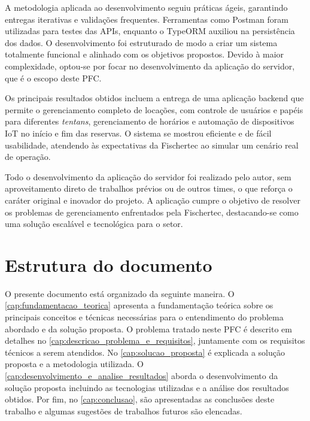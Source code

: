 A metodologia aplicada ao desenvolvimento seguiu práticas ágeis, garantindo entregas iterativas e validações frequentes. Ferramentas como Postman foram utilizadas para testes das APIs, enquanto o TypeORM auxiliou na persistência dos dados. O desenvolvimento foi estruturado de modo a criar um sistema totalmente funcional e alinhado com os objetivos propostos. Devido à maior complexidade, optou-se por focar no desenvolvimento da aplicação do servidor, que é o escopo deste PFC.

Os principais resultados obtidos incluem a entrega de uma aplicação backend que permite o gerenciamento completo de locações, com controle de usuários e papéis para diferentes \textit{tentans}, gerenciamento de horários e automação de dispositivos IoT no início e fim das reservas. O sistema se mostrou eficiente e de fácil usabilidade, atendendo às expectativas da Fischertec ao simular um cenário real de operação. 

Todo o desenvolvimento da aplicação do servidor foi realizado pelo autor, sem aproveitamento direto de trabalhos prévios ou de outros times, o que reforça o caráter original e inovador do projeto. A aplicação cumpre o objetivo de resolver os problemas de gerenciamento enfrentados pela Fischertec, destacando-se como uma solução escalável e tecnológica para o setor.

\section{Estrutura do documento}

O presente documento está organizado da seguinte maneira. O \autoref{cap:fundamentacao_teorica} apresenta a fundamentação teórica sobre os principais conceitos e técnicas necessárias para o entendimento do problema abordado e da solução proposta. O problema tratado neste PFC é descrito em detalhes no \autoref{cap:descricao_problema_e_requisitos}, juntamente com os requisitos técnicos a serem atendidos. No \autoref{cap:solucao_proposta} é explicada a solução proposta e a metodologia utilizada. O \autoref{cap:desenvolvimento_e_analise_resultados} aborda o desenvolvimento da solução proposta incluindo as tecnologias utilizadas e a análise dos resultados obtidos. Por fim, no \autoref{cap:conclusao}, são apresentadas as conclusões deste trabalho e algumas sugestões de trabalhos futuros são elencadas.
